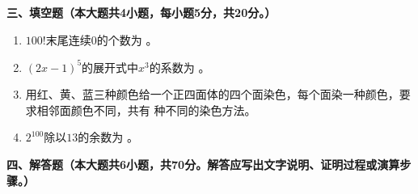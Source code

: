 \documentclass[12pt, a4paper]{ctexart}
\begin{document}
\vspace{0.5em}

\noindent\textbf{三、填空题（本大题共4小题，每小题5分，共20分。）}

\begin{enumerate}[label=\arabic*.]

\item $100!$末尾连续$0$的个数为 \underline{\hspace{3cm}}。

\item $(2x-1)^5$的展开式中$x^3$的系数为 \underline{\hspace{3cm}}。

\item 用红、黄、蓝三种颜色给一个正四面体的四个面染色，每个面染一种颜色，要求相邻面颜色不同，共有 \underline{\hspace{3cm}}种不同的染色方法。

\item $2^{100}$除以$13$的余数为 \underline{\hspace{3cm}}。

\end{enumerate}

\vspace{0.5em}

\noindent\textbf{四、解答题（本大题共6小题，共70分。解答应写出文字说明、证明过程或演算步骤。）}
\end{document}
